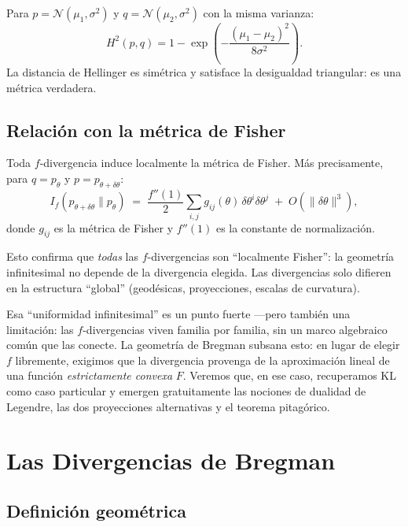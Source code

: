 \begin{example}
	Para $p = \mathcal{N}(\mu_1, \sigma^2)$ y $q = \mathcal{N}(\mu_2, \sigma^2)$ con la misma varianza:
	\[
	H^2(p, q) = 1 - \exp\!\left(-\frac{(\mu_1 - \mu_2)^2}{8\sigma^2}\right).
	\]
	La distancia de Hellinger es simétrica y satisface la desigualdad triangular: es una métrica verdadera.
\end{example}

\subsection{Relación con la métrica de Fisher}

\begin{theorem}
	Toda $f$-divergencia induce localmente la métrica de Fisher.  Más precisamente, para $q = p_\theta$ y $p = p_{\theta + \delta\theta}$:
	\[
	I_f(p_{\theta+\delta\theta} \| p_\theta) \;=\; \frac{f''(1)}{2} \sum_{i,j} g_{ij}(\theta)\, \delta\theta^i \delta\theta^j \;+\; O(\|\delta\theta\|^3),
	\]
	donde $g_{ij}$ es la métrica de Fisher y $f''(1)$ es la constante de normalización.
\end{theorem}

Esto confirma que \emph{todas} las $f$-divergencias son ``localmente Fisher'': la geometría infinitesimal no depende de la divergencia elegida.  Las divergencias solo difieren en la estructura ``global'' (geodésicas, proyecciones, escalas de curvatura).

Esa ``uniformidad infinitesimal'' es un punto fuerte ---pero también una limitación: las $f$-divergencias viven familia por familia, sin un marco algebraico común que las conecte. La geometría de Bregman subsana esto: en lugar de elegir $f$ libremente, exigimos que la divergencia provenga de la aproximación lineal de una función \emph{estrictamente convexa} $F$. Veremos que, en ese caso, recuperamos KL como caso particular y emergen gratuitamente las nociones de dualidad de Legendre, las dos proyecciones alternativas y el teorema pitagórico.

\section{Las Divergencias de Bregman}

\subsection{Definición geométrica}

